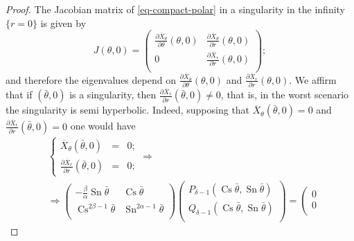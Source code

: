 \documentclass[12pt]{amsart}
\begin{document}
\begin{proof}
The Jacobian matrix of \eqref{eq-compact-polar} in a singularity in the infinity $\{r = 0\}$ is given by
$$
J(\theta, 0) = \left(
  \begin{array}{cc}
    \displaystyle\frac{\partial \overline{X}_{\theta}}{\partial \theta}(\theta, 0) & \displaystyle\frac{\partial \overline{X}_{\theta}}{\partial r}(\theta, 0) \\
    0 & \displaystyle\frac{\partial \overline{X}_{r}}{\partial r}(\theta, 0) \\
  \end{array}
\right);
$$
and therefore the eigenvalues depend on $\frac{\partial \overline{X}_{\theta}}{\partial \theta}(\theta, 0)$ and $\frac{\partial \overline{X}_{r}}{\partial r}(\theta, 0)$. We affirm that if $(\bar{\theta},0)$ is a singularity, then $\frac{\partial \overline{X}_{r}}{\partial r}(\bar{\theta},0) \neq 0$, that is, in the worst scenario the singularity is semi hyperbolic. Indeed, supposing that
$\overline{X}_{\theta}(\bar{\theta}, 0) = 0$ and $ \frac{\partial \overline{X}_{r}}{\partial r}(\bar{\theta},0) = 0$ one would have
\begin{equation*}
\begin{split}
& \left\{
  \begin{array}{rcl}
    \overline{X}_{\theta}(\bar{\theta}, 0) & = & 0; \\
    \frac{\partial \overline{X}_{r}}{\partial r}(\bar{\theta},0) & = & 0;
  \end{array}
\right. \Rightarrow \\
& \Rightarrow
\left(
  \begin{array}{cc}
    -\frac{\beta}{\alpha}\operatorname{Sn}\bar{\theta} & \operatorname{Cs}\bar{\theta} \\
    \operatorname{Cs}^{2\beta - 1}\bar{\theta} & \operatorname{Sn}^{2\alpha - 1}\bar{\theta} \\
  \end{array}
\right)\left(
         \begin{array}{c}
           P_{\delta - 1}(\operatorname{Cs}\bar{\theta},\operatorname{Sn}\bar{\theta}) \\
           Q_{\delta - 1}(\operatorname{Cs}\bar{\theta},\operatorname{Sn}\bar{\theta}) \\
         \end{array}
       \right)
=
\left(
         \begin{array}{c}
           0 \\
           0 \\
         \end{array}

\end{split}
\end{equation*}
\end{proof}
\end{document}
